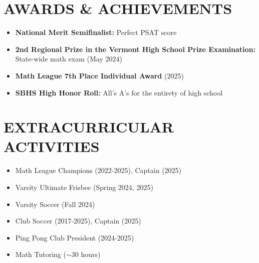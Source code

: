 \documentclass[10pt,letterpaper]{article}
\begin{document}
\vspace{0.5em}
\section{AWARDS \& ACHIEVEMENTS}
\vspace{0.5em}
\begin{itemize}[leftmargin=*,nosep,itemsep=2pt]
  \item \textbf{National Merit Semifinalist:} Perfect PSAT score
  \item \textbf{2nd Regional Prize in the Vermont High School Prize Examination:} State-wide math exam (May 2024)
  \item \textbf{Math League 7th Place Individual Award} (2025)
  \item \textbf{SBHS High Honor Roll:} All's A's for the entirety of high school
\end{itemize}

\vspace{0.5em}
\section{EXTRACURRICULAR ACTIVITIES}
\vspace{0.5em}
\begin{minipage}[t]{0.48\textwidth}
\begin{itemize}[leftmargin=*,nosep,itemsep=2pt]
  \item Math League Champions (2022-2025), Captain (2025)
  \item Varsity Ultimate Frisbee (Spring 2024, 2025)
  \item Varsity Soccer (Fall 2024)
\end{itemize}
\end{minipage}
\hfill
\begin{minipage}[t]{0.48\textwidth}
\begin{itemize}[leftmargin=*,nosep,itemsep=2pt]
  \item Club Soccer (2017-2025), Captain (2025)
  \item Ping Pong Club President (2024-2025)
  \item Math Tutoring ($\sim$30 hours)
\end{itemize}
\end{minipage}
\end{document}
